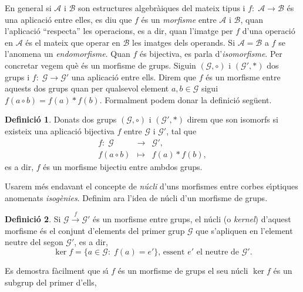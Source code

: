 \documentclass[12pt,twoside,catalan,a4paper]{book}%
\numberwithin{figure}{section}		%
\theoremstyle{definition}   			%
\newtheorem{defi}{Definici\'o}[chapter]%
\def\ces{corbes e\lgem{}\'{\i}ptiques}%
\theoremstyle{saltolinea}   			%
\begin{document}
En general si $\mathcal{A}$ i $\mathcal{B}$ son estructures algebr\`aiques del mateix tipus i $f:\;\mathcal{A}\rightarrow\mathcal{B}$ \'es una aplicaci\'o entre elles, es diu que $f$ \'es un \emph{morfisme} entre $\mathcal{A}$ i $\mathcal{B}$, quan l'aplicaci\'o ``respecta'' les operacions, es a dir, quan l'imatge per $f$ d'una operaci\'o en $\mathcal{A}$ \'es el mateix que operar en $\mathcal{B}$ les imatges dels operands. Si $\mathcal{A}=\mathcal{B}$ a $f$ se l'anomena un \emph{endomorfisme}. Quan $f$ \'es bijectiva, es parla d'\emph{isomorfisme}. Per concretar vegem qu\`e \'es un morfisme de grups. Siguin $(\mathcal{G},\circ)$ i $(\mathcal{G}',\ast)$ dos grups i  $f:\;\mathcal{G}\rightarrow\mathcal{G}'$ una aplicaci\'o entre ells. Direm que $f$ \'es un morfisme entre aquests dos grups quan per qualsevol element $a,b\in\mathcal{G}$ sigui $f(a\circ b)=f(a)\ast f(b)$. Formalment podem donar la definici\'o seg\"uent.
\begin{defi}\label{def:isomorf} Donats dos grups $(\mathcal{G},\circ)$ i $(\mathcal{G}',\ast)$ direm que son isomorfs si existeix una aplicaci\'o bijectiva $f$ entre $\mathcal{G}$ i $\mathcal{G}'$, tal que
$$\begin{array}{rcl}f:\;\mathcal{G} &\longrightarrow &\mathcal{G}',\\ f(a\circ b) &\longmapsto & f(a)\ast f(b),\end{array}$$
es a dir, $f$ \'es un morfisme bijectiu entre ambdos grups.
\end{defi}
Usarem m\'es endavant el concepte de \emph{n\'ucli} d'uns morfismes entre \ces{} anomenats \emph{isog\`enies}. Definim ara l'idea de n\'ucli d'un morfisme de grups.
\begin{defi}\label{def:ker} Si $\mathcal{G}\xrightarrow{f}\mathcal{G}'$ \'es un morfisme entre grups, el n\'ucli (o \emph{kernel}) d'aquest morfisme \'es el conjunt d'elements del primer grup $\mathcal{G}$ que s'apliquen en l'element neutre del segon $\mathcal{G}'$, es a dir,
$$\ker f=\{a\in\mathcal{G}:\;f(a)=e'\}\text{, essent $e'$ el neutre de }\mathcal{G}'.$$
\end{defi}
Es demostra f\`acilment que s\'{\i} $f$ \'es un morfisme de grups el seu n\'ucli $\ker f$ \'es un subgrup del primer d'ells,
\end{document}
